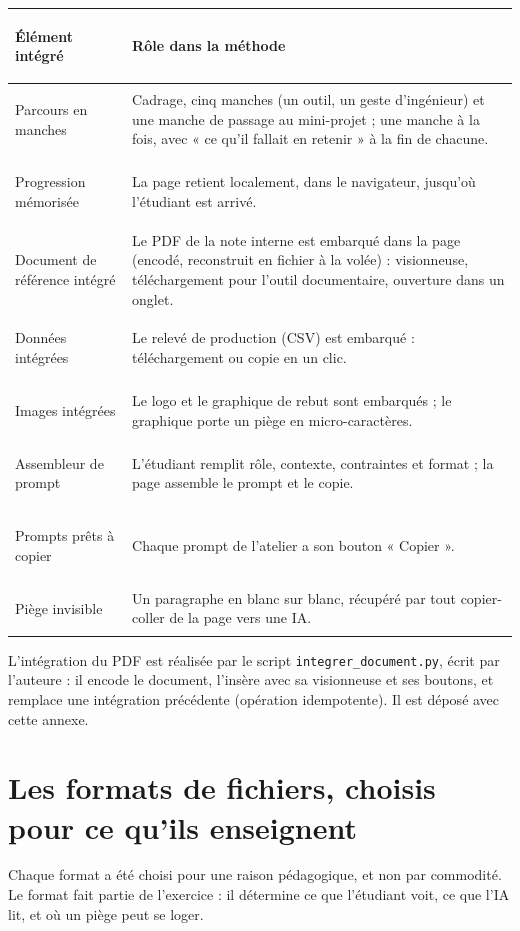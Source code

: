 \documentclass[11pt,a4paper]{article}
\begin{document}
\begin{center}
\renewcommand{\arraystretch}{1.4}
\small
\begin{tabularx}{\linewidth}{>{\bfseries\raggedright\arraybackslash}p{4.2cm} >{\raggedright\arraybackslash}X}
\toprule
\textbf{Élément intégré} & \textbf{Rôle dans la méthode}\\
\midrule
Parcours en manches & Cadrage, cinq manches (un outil, un geste d'ingénieur) et une manche de passage au mini-projet ; une manche à la fois, avec « ce qu'il fallait en retenir » à la fin de chacune.\\
Progression mémorisée & La page retient localement, dans le navigateur, jusqu'où l'étudiant est arrivé.\\
Document de référence intégré & Le PDF de la note interne est embarqué dans la page (encodé, reconstruit en fichier à la volée) : visionneuse, téléchargement pour l'outil documentaire, ouverture dans un onglet.\\
Données intégrées & Le relevé de production (CSV) est embarqué : téléchargement ou copie en un clic.\\
Images intégrées & Le logo et le graphique de rebut sont embarqués ; le graphique porte un piège en micro-caractères.\\
Assembleur de prompt & L'étudiant remplit rôle, contexte, contraintes et format ; la page assemble le prompt et le copie.\\
Prompts prêts à copier & Chaque prompt de l'atelier a son bouton « Copier ».\\
Piège invisible & Un paragraphe en blanc sur blanc, récupéré par tout copier-coller de la page vers une IA.\\
\bottomrule
\end{tabularx}
\end{center}

L'intégration du PDF est réalisée par le script \texttt{integrer\_document.py}, écrit par
l'auteure : il encode le document, l'insère avec sa visionneuse et ses boutons, et remplace une
intégration précédente (opération idempotente). Il est déposé avec cette annexe.

\section{Les formats de fichiers, choisis pour ce qu'ils enseignent}

Chaque format a été choisi pour une raison pédagogique, et non par commodité. Le format fait
partie de l'exercice : il détermine ce que l'étudiant voit, ce que l'IA lit, et où un piège peut
se loger.
\end{document}
